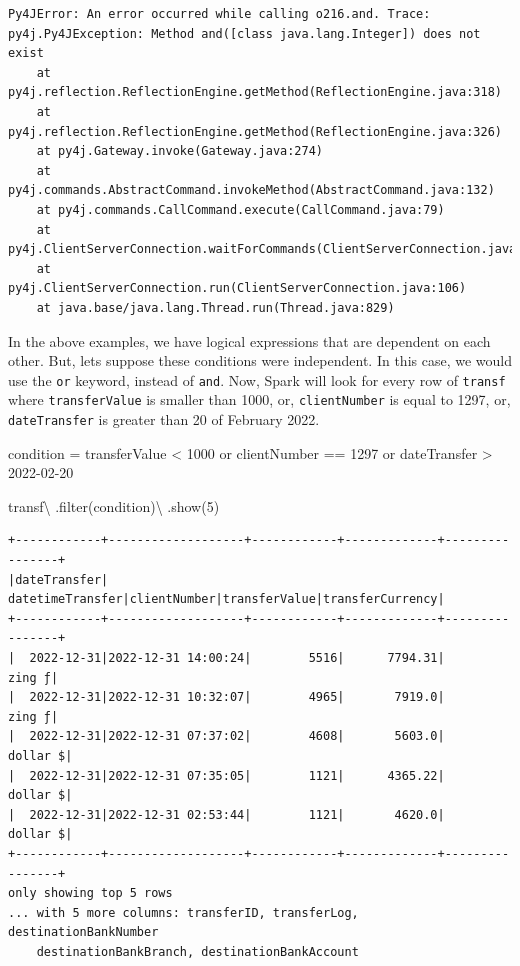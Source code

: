 \documentclass[
  11pt,
  letterpaper,
  DIV=11,
  numbers=noendperiod]{scrreprt}
\newenvironment{Shaded}{\begin{snugshade}}{\end{snugshade}}
\newcommand{\BuiltInTok}[1]{\textcolor[rgb]{0.00,0.23,0.31}{#1}}
\newcommand{\DecValTok}[1]{\textcolor[rgb]{0.68,0.00,0.00}{#1}}
\newcommand{\NormalTok}[1]{\textcolor[rgb]{0.00,0.23,0.31}{#1}}
\newcommand{\OperatorTok}[1]{\textcolor[rgb]{0.37,0.37,0.37}{#1}}
\newcommand{\StringTok}[1]{\textcolor[rgb]{0.13,0.47,0.30}{#1}}
\begin{document}
\begin{verbatim}
Py4JError: An error occurred while calling o216.and. Trace:
py4j.Py4JException: Method and([class java.lang.Integer]) does not exist
    at py4j.reflection.ReflectionEngine.getMethod(ReflectionEngine.java:318)
    at py4j.reflection.ReflectionEngine.getMethod(ReflectionEngine.java:326)
    at py4j.Gateway.invoke(Gateway.java:274)
    at py4j.commands.AbstractCommand.invokeMethod(AbstractCommand.java:132)
    at py4j.commands.CallCommand.execute(CallCommand.java:79)
    at py4j.ClientServerConnection.waitForCommands(ClientServerConnection.java:182)
    at py4j.ClientServerConnection.run(ClientServerConnection.java:106)
    at java.base/java.lang.Thread.run(Thread.java:829)
\end{verbatim}

In the above examples, we have logical expressions that are dependent on
each other. But, lets suppose these conditions were independent. In this
case, we would use the \texttt{or} keyword, instead of \texttt{and}.
Now, Spark will look for every row of \texttt{transf} where
\texttt{transferValue} is smaller than 1000, or, \texttt{clientNumber}
is equal to 1297, or, \texttt{dateTransfer} is greater than 20 of
February 2022.

\begin{Shaded}
\begin{Highlighting}[]
\NormalTok{condition }\OperatorTok{=} \StringTok{\textquotesingle{}\textquotesingle{}\textquotesingle{}}
\StringTok{  transferValue \textless{} 1000}
\StringTok{  or clientNumber == 1297 }
\StringTok{  or dateTransfer \textgreater{} \textquotesingle{}2022{-}02{-}20\textquotesingle{}}
\StringTok{\textquotesingle{}\textquotesingle{}\textquotesingle{}}

\NormalTok{transf}\OperatorTok{\textbackslash{}}
\NormalTok{  .}\BuiltInTok{filter}\NormalTok{(condition)}\OperatorTok{\textbackslash{}}
\NormalTok{  .show(}\DecValTok{5}\NormalTok{)}
\end{Highlighting}
\end{Shaded}

\begin{verbatim}
+------------+-------------------+------------+-------------+----------------+
|dateTransfer|   datetimeTransfer|clientNumber|transferValue|transferCurrency|
+------------+-------------------+------------+-------------+----------------+
|  2022-12-31|2022-12-31 14:00:24|        5516|      7794.31|          zing ƒ|
|  2022-12-31|2022-12-31 10:32:07|        4965|       7919.0|          zing ƒ|
|  2022-12-31|2022-12-31 07:37:02|        4608|       5603.0|        dollar $|
|  2022-12-31|2022-12-31 07:35:05|        1121|      4365.22|        dollar $|
|  2022-12-31|2022-12-31 02:53:44|        1121|       4620.0|        dollar $|
+------------+-------------------+------------+-------------+----------------+
only showing top 5 rows
... with 5 more columns: transferID, transferLog, destinationBankNumber
    destinationBankBranch, destinationBankAccount
\end{verbatim}
\end{document}
